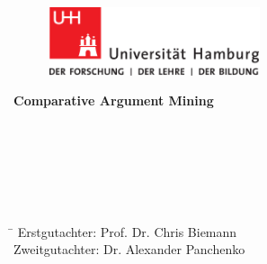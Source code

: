 \begin{titlepage}

  \setcounter{page}{-1}

	\begin{figure}[h]
		\begin{minipage}[b]{62mm}
			\includegraphics[width=62mm]{images/unilogo}
		\end{minipage}
		\hspace{4cm}
		\begin{minipage}[b]{59mm}
		\end{minipage}
	\end{figure}

	\vfill
	
	\begin{center}
		\vspace{14mm}
		\noindent \textbf{\huge
		  Comparative Argument Mining
		}
		\vspace{60mm}	
	\end{center}
	
	\vfill
	
	 \\
		 \\
	 \\
		 \\
	 \\

	\begin{tabbing}
	\hspace{8em} \=  \kill
	Erstgutachter: \> Prof. Dr. Chris Biemann \\
	Zweitgutachter: \> Dr. Alexander Panchenko \\
	~ \\
	\end{tabbing}
	
	\newpage 
	\thispagestyle{empty}
	\setcounter{page}{0}

	
\end{titlepage}

